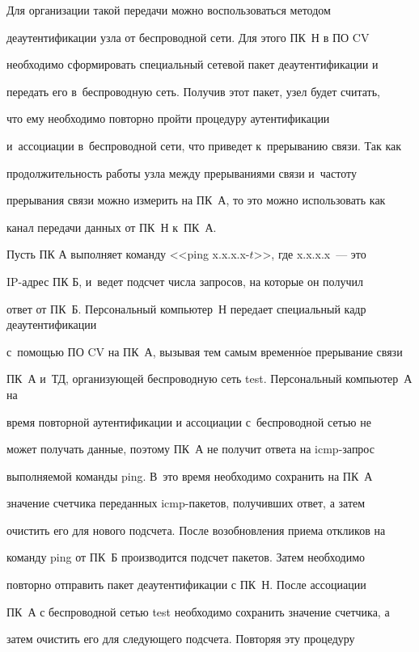   Для организации такой передачи можно воспользоваться методом


деаутентификации узла от беспроводной сети. Для этого ПК~Н в ПО CV


необходимо сформировать специальный сетевой пакет деаутентификации и


передать его в~беспроводную сеть. Получив этот пакет, узел будет считать,


что ему необходимо повторно пройти процедуру аутентификации


и~ассоциации в~беспроводной сети, что приведет к~прерыванию связи. Так как


продолжительность работы узла между прерываниями связи и~частоту


прерывания связи можно измерить на ПК~А, то это можно использовать как


канал передачи данных от ПК~Н к~ПК~А.





  Пусть ПК А выполняет команду <<ping x.x.x.x\;-\;$t$>>, где x.x.x.x~--- это


  IP-ад\-рес ПК Б, и~ведет подсчет числа запросов, на которые он получил


ответ от ПК~Б. Персональный компьютер~Н передает специальный кадр деаутентификации


с~по\-мощью ПО CV на ПК~А, вызывая тем самым временн$\acute{\mbox{о}}$е прерывание связи


ПК~А и~ТД, организующей беспроводную сеть test. Персональный компьютер~А на


время повторной аутентификации и ассоциации с~беспроводной сетью не


может получать данные, поэтому ПК~А не получит ответа на icmp-за\-прос


выполняемой команды ping. В~это время необходимо сохранить на ПК~А


значение счетчика переданных icmp-па\-ке\-тов, получивших ответ, а затем


очистить его для нового подсчета. После возобновления приема откликов на


команду ping от ПК~Б производится подсчет пакетов. Затем необходимо


повторно отправить пакет деаутентификации с ПК~Н. После ассоциации


ПК~А с беспроводной сетью test необходимо сохранить значение счетчика, а


затем очистить его для следующего подсчета. Повторяя эту процедуру


